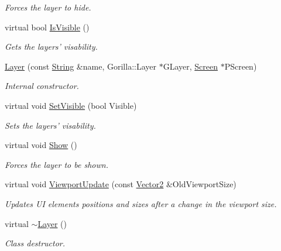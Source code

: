 \begin{DoxyCompactItemize}
\begin{DoxyCompactList}\small\item\em Forces the layer to hide. \item\end{DoxyCompactList}\item 
virtual bool \hyperlink{classphys_1_1UI_1_1Layer_a33f23515b8ac60adc2e99435574a2d9d}{IsVisible} ()
\begin{DoxyCompactList}\small\item\em Gets the layers' visability. \item\end{DoxyCompactList}\item 
\hyperlink{classphys_1_1UI_1_1Layer_a26fd46d043fa1786a543b4c6b3863643}{Layer} (const \hyperlink{namespacephys_aa03900411993de7fbfec4789bc1d392e}{String} \&name, Gorilla::Layer $\ast$GLayer, \hyperlink{classphys_1_1UI_1_1Screen}{Screen} $\ast$PScreen)
\begin{DoxyCompactList}\small\item\em Internal constructor. \item\end{DoxyCompactList}\item 
virtual void \hyperlink{classphys_1_1UI_1_1Layer_a421ed59dd2f50bed32a9e32c03327c39}{SetVisible} (bool Visible)
\begin{DoxyCompactList}\small\item\em Sets the layers' visability. \item\end{DoxyCompactList}\item 
\hypertarget{classphys_1_1UI_1_1Layer_ad8828d0c891ebbb9d7b9ca112793c725}{
virtual void \hyperlink{classphys_1_1UI_1_1Layer_ad8828d0c891ebbb9d7b9ca112793c725}{Show} ()}
\label{classphys_1_1UI_1_1Layer_ad8828d0c891ebbb9d7b9ca112793c725}

\begin{DoxyCompactList}\small\item\em Forces the layer to be shown. \item\end{DoxyCompactList}\item 
virtual void \hyperlink{classphys_1_1UI_1_1Layer_a832101f21d8601f296782fc24ac02705}{ViewportUpdate} (const \hyperlink{classphys_1_1Vector2}{Vector2} \&OldViewportSize)
\begin{DoxyCompactList}\small\item\em Updates UI elements positions and sizes after a change in the viewport size. \item\end{DoxyCompactList}\item 
\hypertarget{classphys_1_1UI_1_1Layer_a02f12501f3efbb5b06d59bfc04fab50d}{
virtual \hyperlink{classphys_1_1UI_1_1Layer_a02f12501f3efbb5b06d59bfc04fab50d}{$\sim$Layer} ()}
\label{classphys_1_1UI_1_1Layer_a02f12501f3efbb5b06d59bfc04fab50d}

\begin{DoxyCompactList}\small\item\em Class destructor. \item\end{DoxyCompactList}\end{DoxyCompactItemize}
